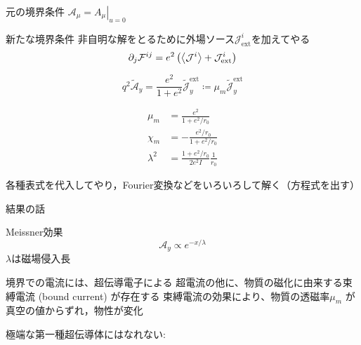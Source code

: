 \documentclass[b5paper,11pt,dvipdfmx]{jsarticle}
\numberwithin{equation}{section}
\theoremstyle{definition}
\begin{document}
元の境界条件
$\mathcal{A}_\mu = \left. A_\mu \right|_{u = 0}$






新たな境界条件
非自明な解をとるために外場ソース$\mathcal{J}_{\text{ext}}^i$を加えてやる
\begin{equation}
    \partial_{j} \mathcal{F}^{ij}
    = e^{2} \left( \ev{\mathcal{J}^{i}} + \mathcal{J}_{\text{ext}}^i \right)
\end{equation}

\begin{equation}
    q^2 \tilde{\mathcal{A}}_y
    = \frac{e^2}{1 + e^2} \tilde{\mathcal{J}}^{\text{ext}}_y
    \coloneq \mu_m \tilde{\mathcal{J}}^{\text{ext}}_y
\end{equation}











\begin{equation}
    \begin{split}
            \mu_m
            &= \frac{e^2}{1 + e^2 / r_0}\\
            \chi_m
            &= - \frac{e^2 / r_0}{1 + e^2 / r_0}\\
            \lambda^2
            &= \frac{1 + e^2 / r_0}{2 e^2 I}\frac{1}{r_0}
    \end{split}
\end{equation}


















各種表式を代入してやり，Fourier変換などをいろいろして解く（方程式を出す）



結果の話

Meissner効果
\begin{equation}
    \mathcal{A}_{y}\propto e^{-x/\lambda}
\end{equation}
$\lambda$は磁場侵入長

境界での電流には、超伝導電子による
超電流の他に、物質の磁化に由来する束縛電流 (bound current) が存在する
束縛電流の効果により、物質の透磁率$\mu_m$ が真空の値からずれ，物性が変化

極端な第一種超伝導体にはなれない:
\end{document}
